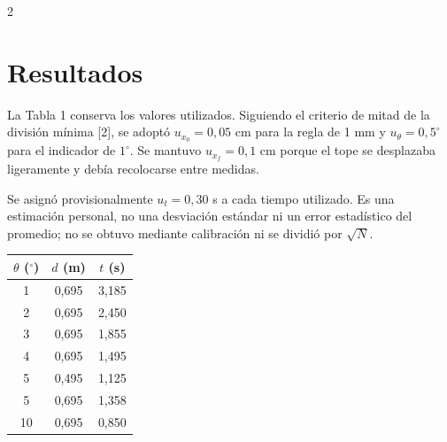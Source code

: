 \documentclass[10pt,letterpaper]{article}
\begin{document}
\begin{multicols}{2}
\section{Resultados}
La Tabla 1 conserva los valores utilizados. Siguiendo el criterio de mitad de la división mínima [2], se adoptó $u_{x_0}=0{,}05$ cm para la regla de 1 mm y $u_\theta=0{,}5^\circ$ para el indicador de $1^\circ$. Se mantuvo $u_{x_f}=0{,}1$ cm porque el tope se desplazaba ligeramente y debía recolocarse entre medidas.

Se asignó provisionalmente $u_t=0{,}30$ s a cada tiempo utilizado. Es una estimación personal, no una desviación estándar ni un error estadístico del promedio; no se obtuvo mediante calibración ni se dividió por $\sqrt{N}$.

\begin{center}\begin{minipage}{\linewidth}\centering
{}
\small
\begin{tabular}{ccc}\toprule
$\theta$ ($^\circ$) & $d$ (m) & $t$ (s) \\ \midrule
1 & 0,695 & 3,185 \\
2 & 0,695 & 2,450 \\
3 & 0,695 & 1,855 \\
4 & 0,695 & 1,495 \\
5 & 0,495 & 1,125 \\
5 & 0,695 & 1,358 \\
10 & 0,695 & 0,850 \\
\bottomrule\end{tabular}
\end{minipage}\end{center}


\end{multicols}
\end{document}

